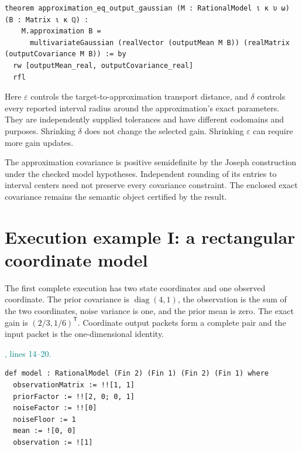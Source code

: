 \documentclass[11pt]{article}\usepackage{needspace}\renewcommand{\paperkind}{Lean companion}\setlength{\parskip}{0.35em}
\begin{document}
\begin{lstlisting}[style=BayesSource]
theorem approximation_eq_output_gaussian (M : RationalModel ι κ υ ω) (B : Matrix ι κ ℚ) :
    M.approximation B =
      multivariateGaussian (realVector (outputMean M B)) (realMatrix (outputCovariance M B)) := by
  rw [outputMean_real, outputCovariance_real]
  rfl
\end{lstlisting}

Here $\varepsilon$ controls the target-to-approximation transport distance, and $\delta$ controls every reported interval radius around the approximation's exact parameters. They are independently supplied tolerances and have different codomains and purposes. Shrinking $\delta$ does not change the selected gain. Shrinking $\varepsilon$ can require more gain updates.

The approximation covariance is positive semidefinite by the Joseph construction under the checked model hypotheses. Independent rounding of its entries to interval centers need not preserve every covariance constraint. The enclosed exact covariance remains the semantic object certified by the result.

\section{Execution example I: a rectangular coordinate model}

The first complete execution has two state coordinates and one observed coordinate. The prior covariance is $\operatorname{diag}(4,1)$, the observation is the sum of the two coordinates, noise variance is one, and the prior mean is zero. The exact gain is $(2/3,1/6)^{\mathsf T}$. Coordinate output packets form a complete pair and the input packet is the one-dimensional identity.



{\small\textcolor{teal}{, lines 14--20.}\par}

\begin{lstlisting}[style=BayesSource]
def model : RationalModel (Fin 2) (Fin 1) (Fin 2) (Fin 1) where
  observationMatrix := !![1, 1]
  priorFactor := !![2, 0; 0, 1]
  noiseFactor := !![0]
  noiseFloor := 1
  mean := ![0, 0]
  observation := ![1]
\end{lstlisting}
\end{document}
